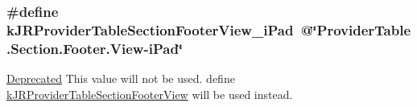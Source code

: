 \hypertarget{group__custom_interface_gaa2196cc44d4e0dc4de9e98248c8a7e10}{
\subsubsection[{kJRProviderTableSectionFooterView\_\-iPad}]{\setlength{\rightskip}{0pt plus 5cm}\#define kJRProviderTableSectionFooterView\_\-iPad~@\char`\"{}ProviderTable.Section.Footer.View-\/iPad\char`\"{}}}
\label{group__custom_interface_gaa2196cc44d4e0dc4de9e98248c8a7e10}
\begin{Desc}
\item[\hyperlink{deprecated__deprecated000017}{Deprecated}]This value will not be used. define \hyperlink{group__custom_interface_ga984c096e9258dea402a1c27ae8bb6c8f}{kJRProviderTableSectionFooterView} will be used instead. \end{Desc}

